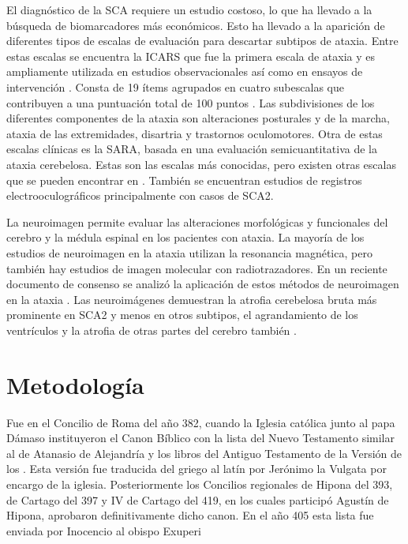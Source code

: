 \documentclass[a4paper,12pt]{article}
\begin{document}
El diagnóstico de la SCA requiere un estudio costoso, lo que ha llevado a la búsqueda de biomarcadores más económicos. Esto ha llevado a la aparición de diferentes tipos de escalas de evaluación para descartar subtipos de ataxia. Entre estas escalas se encuentra la ICARS que fue la primera escala de ataxia y es ampliamente utilizada en estudios observacionales así como en ensayos de intervención \cite{bhandari_spinocerebellar_2022}. Consta de 19 ítems agrupados en cuatro subescalas que contribuyen a una puntuación total de 100 puntos \cite{paap_standardized_2016}. Las subdivisiones de los diferentes componentes de la ataxia son alteraciones posturales y de la marcha, ataxia de las extremidades, disartria y trastornos oculomotores. Otra de estas escalas clínicas es la SARA, basada en una evaluación semicuantitativa de la ataxia cerebelosa. Estas son las escalas más conocidas, pero existen otras escalas que se pueden encontrar en \cite{silva_diagnosis_2019,muthuswamy_diagnosis_2013}. También se encuentran estudios de registros electrooculográficos principalmente con casos de SCA2.

La neuroimagen permite evaluar las alteraciones morfológicas y funcionales del cerebro y la médula espinal en los pacientes con ataxia. La mayoría de los estudios de neuroimagen en la ataxia utilizan la resonancia magnética, pero también hay estudios de imagen molecular con radiotrazadores. En un reciente documento de consenso se analizó la aplicación de estos métodos de neuroimagen en la ataxia \cite{oz_mr_2020,klaes_mr_2016,wan_mr_2020}.  Las neuroimágenes demuestran la atrofia cerebelosa bruta más prominente en SCA2 y menos en otros subtipos, el agrandamiento de los ventrículos y la atrofia de otras partes del cerebro también \cite{cocozza_conventional_2021,cabeza-ruiz_convolutional_2021,cabeza-ruiz_convolutional_2022,klaes_mr_2016,oz_mr_2020,mascalchi_neuroimaging_2020}. 


	
\section{Metodología}
Fue en el Concilio de Roma del año 382, cuando la Iglesia católica junto al papa Dámaso instituyeron el Canon Bíblico con la lista del Nuevo Testamento similar al de Atanasio de Alejandría y los libros del Antiguo Testamento de la Versión de los . Esta versión fue traducida del griego al latín por Jerónimo la Vulgata por encargo de la iglesia. Posteriormente los Concilios regionales de Hipona del 393,  de Cartago del 397 y IV de Cartago del 419, en los cuales participó Agustín de Hipona, aprobaron definitivamente dicho canon. En el año 405 esta lista fue enviada por Inocencio al obispo Exuperi
\end{document}
